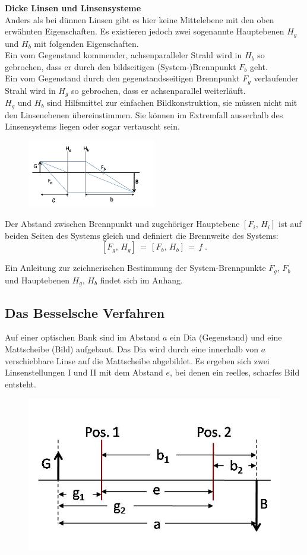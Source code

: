 \noindent
\textbf{Dicke Linsen und Linsensysteme}\\
Anders als bei dünnen Linsen gibt es hier keine Mittelebene mit den oben erwähnten Eigenschaften. Es existieren jedoch zwei sogenannte Hauptebenen $H_g$ und $H_b$ mit folgenden Eigenschaften.\\
Ein vom Gegenstand kommender, achsenparalleler Strahl wird in $H_b$ so gebrochen, dass er durch den bildseitigen (System-)Brennpunkt $F_b$ geht.\\
Ein vom Gegenstand durch den gegenstandsseitigen Brennpunkt $F_g$ verlaufender Strahl wird in $H_g$ so gebrochen, dass er achsenparallel weiterläuft.\\
$H_g$ und $H_b$ sind Hilfsmittel zur einfachen Bildkonstruktion, sie müssen nicht mit den Linsenebenen übereinstimmen. Sie können im Extremfall ausserhalb des Linsensystems liegen oder sogar vertauscht sein. 
\begin{figure}[h]
	\centering
		\includegraphics[width=0.5\textwidth]{Versuch_7-8/Abbildungen/dicke_linse.jpg}
	\label{fig:dicke_linse}
\end{figure}

Der Abstand zwischen Brennpunkt und zugehöriger Hauptebene $\left[F_i,\,H_i\right]$ ist auf beiden Seiten des Systems gleich und definiert die Brennweite des Systems:
\[
\left[F_g,\,H_g\right]\,=\,\left[F_b,\,H_b\right]\,=\, f\; .
\]

\noindent
Ein Anleitung zur zeichnerischen Bestimmung der System-Brennpunkte $F_g$, $F_b$ und Hauptebenen $H_g$, $H_b$ findet sich im Anhang.

\subsection{Das Besselsche Verfahren}

Auf einer optischen Bank sind im Abstand $a$ ein Dia (Gegenstand) und eine Mattscheibe (Bild) aufgebaut. Das Dia wird durch eine innerhalb von $a$ verschiebbare Linse auf die Mattscheibe abgebildet. Es ergeben sich zwei Linsenstellungen I und II mit dem Abstand $e$, bei denen ein reelles, scharfes Bild entsteht.\\
\begin{figure}[h]
	\centering
		\includegraphics[width=0.5\linewidth]{Versuch_7-8/Abbildungen/bessel_neu.jpg}
	\label{fig:bessel}
\end{figure}

